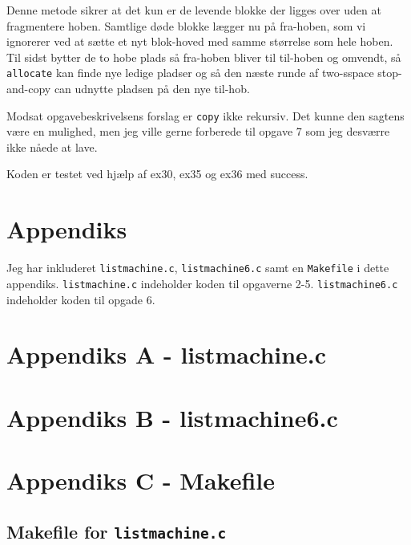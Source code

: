\documentclass{article}
\begin{document}
Denne metode sikrer at det kun er de levende blokke der ligges over uden at fragmentere hoben. Samtlige døde blokke lægger nu på fra-hoben, som vi ignorerer ved at sætte et nyt blok-hoved med samme størrelse som hele hoben. Til sidst bytter de to hobe plads så fra-hoben bliver til til-hoben og omvendt, så \texttt{allocate} kan finde nye ledige pladser og så den næste runde af two-sspace stop-and-copy can udnytte pladsen på den nye til-hob.

Modsat opgavebeskrivelsens forslag er \texttt{copy} ikke rekursiv. Det kunne den sagtens være en mulighed, men jeg ville gerne forberede til opgave 7 som jeg desværre ikke nåede at lave. 

Koden er testet ved hjælp af ex30, ex35 og ex36 med success. 

\newpage

\section*{Appendiks}
Jeg har inkluderet \texttt{listmachine.c}, \texttt{listmachine6.c} samt en  \texttt{Makefile} i dette appendiks. \texttt{listmachine.c} indeholder koden til opgaverne 2-5. \texttt{listmachine6.c} indeholder koden til opgade 6.

\label{listmachine}
\section*{Appendiks A - listmachine.c}


\newpage

\section*{Appendiks B - listmachine6.c}


\newpage 

\section*{Appendiks C - Makefile}
\subsection*{Makefile for \texttt{listmachine.c}}


\label{lastPage}
\end{document}
